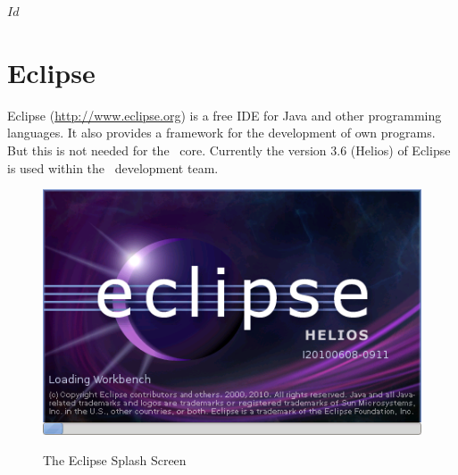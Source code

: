 \SVN$Id$
\section{Eclipse}

%
%
%
%
%
Eclipse (\url{http://www.eclipse.org}) is a free IDE for Java and
other programming languages. It also provides a framework for the
development of own programs. But this is not needed for the \ExTeX\ 
core. Currently the version 3.6 (Helios) of
Eclipse is used within the \ExTeX\ development team.
\begin{figure}[h]
  \centering  \includegraphics[scale=.5]{image/eclipse/splash}
  \caption{The Eclipse Splash Screen}\label{fig:eclipse}
\end{figure}

